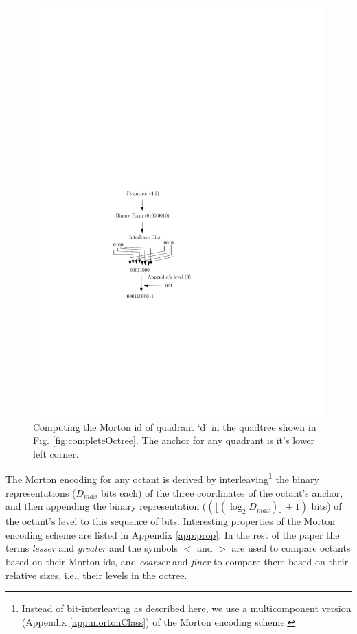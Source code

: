 \begin{figure}
  \begin{center}
    \includegraphics[width=0.2\textheight]{images/mortonInterleaving}
    \caption{Computing the Morton id of quadrant `d' in the quadtree
    shown in Fig. \ref{fig:completeOctree}. The anchor for any
    quadrant is it's lower left corner.}
    \label{fig:mortonInterleaving}
  \end{center}
\end{figure}

The Morton encoding for any octant is derived by
interleaving\footnote{Instead of bit-interleaving as described here,
we use a multicomponent version (Appendix \ref{app:mortonClass}) of
the Morton encoding scheme.} the binary representations ($D_{max}$
bits each) of the three coordinates of the octant's anchor, and then
appending the binary representation ($(\lfloor(\log_2{D_{max}})\rfloor
+ 1)$ bits) of the octant's level to this sequence of
bits. Interesting properties of the Morton encoding scheme are listed
in Appendix \ref{app:prop}.  In the rest of the paper the terms {\em
lesser} and {\em greater} and the symbols $<$ and $>$ are used to
compare octants based on their Morton ids, and {\em coarser} and {\em
finer} to compare them based on their relative sizes, i.e., their
levels in the octree.

